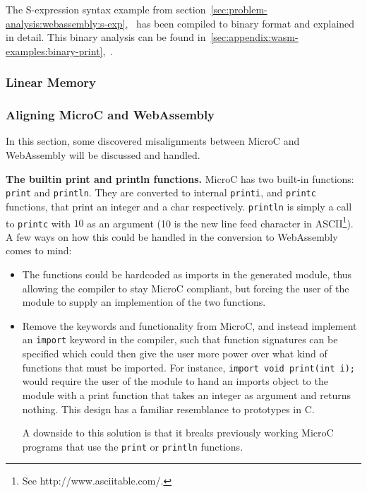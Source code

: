 \documentclass[a4paper]{article}
\begin{document}
The S-expression syntax example from section~\ref{sec:problem-analysis:webassembly:s-exp},~ has been compiled to binary format and explained in detail. This binary analysis can be found in~\ref{sec:appendix:wasm-examples:binary-print},~.

\subsubsection{Linear Memory}
\label{sec:problem-analysis-webassembly:linear-memory}

\subsubsection{Aligning MicroC and WebAssembly}
\label{sec:problem-analysis-webassembly:aligning}
In this section, some discovered misalignments between MicroC and WebAssembly will be discussed and handled.

\noindent \textbf{The builtin print and println functions.} MicroC has two built-in functions: \texttt{print} and \texttt{println}. They are converted to internal \texttt{printi}, and \texttt{printc} functions, that print an integer and a char respectively. \texttt{println} is simply a call to \texttt{printc} with $10$ as an argument (10 is the new line feed character in ASCII\footnote{See http://www.asciitable.com/.}). A few ways on how this could be handled in the conversion to WebAssembly comes to mind:
\begin{itemize}
	\item The functions could be hardcoded as imports in the generated module, thus allowing the compiler to stay MicroC compliant, but forcing the user of the module to supply an implemention of the two functions.
	\item Remove the keywords and functionality from MicroC, and instead implement an \texttt{import} keyword in the compiler, such that function signatures can be specified which could then give the user more power over what kind of functions that must be imported. For instance, \texttt{import void print(int i);} would require the user of the module to hand an imports object to the module with a print function that takes an integer as argument and returns nothing. This design has a familiar resemblance to prototypes in C.

	A downside to this solution is that it breaks previously working MicroC programs that use the \texttt{print} or \texttt{println} functions.
\end{itemize}
\end{document}
